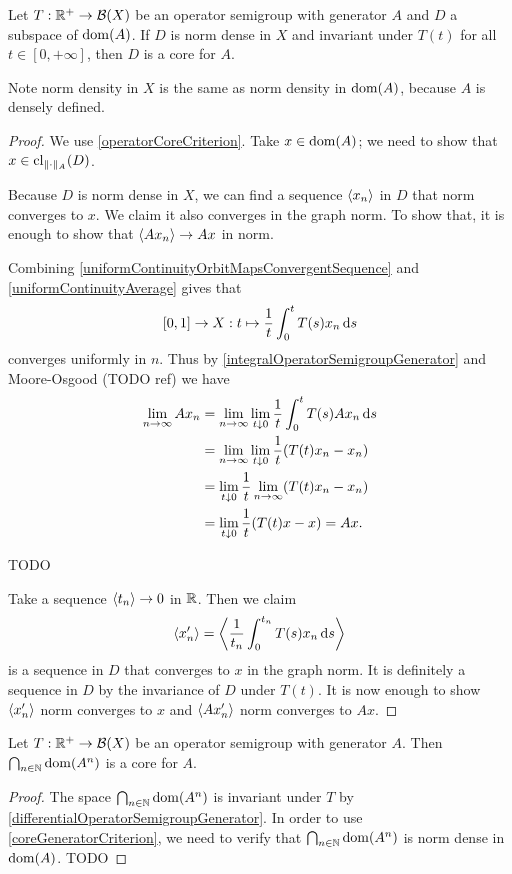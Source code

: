 \begin{proposition} \label{coreGeneratorCriterion}
Let $T: \mathbb{R}^+\to \operatorname{\mathcal{B}}(X)$ be an operator semigroup with generator $A$ and $D$ a subspace of $\operatorname{dom}(A)$. If $D$ is norm dense in $X$ and invariant under $T(t)$ for all $t\in [0,+\infty]$, then $D$ is a core for $A$.
\end{proposition}
Note norm density in $X$ is the same as norm density in $\operatorname{dom}(A)$, because $A$ is densely defined.
\begin{proof}
We use \ref{operatorCoreCriterion}. Take $x\in \operatorname{dom}(A)$; we need to show that $x\in\operatorname{cl}_{\lVert\cdot\rVert_A}(D)$.

Because $D$ is norm dense in $X$, we can find a sequence $\left\langle x_n \right\rangle$ in $D$ that norm converges to $x$. We claim it also converges in the graph norm. To show that, it is enough to show that $\left\langle Ax_n \right\rangle \to Ax$ in norm.

Combining \ref{uniformContinuityOrbitMapsConvergentSequence} and \ref{uniformContinuityAverage} gives that
\[ [0,1] \to X: t\mapsto \frac{1}{t}\int_0^t T(s)x_n\operatorname{d \!}{s} \]
converges uniformly in $n$. Thus by \ref{integralOperatorSemigroupGenerator} and Moore-Osgood (TODO ref) we have
\begin{align*}
\lim_{n\to \infty} Ax_n &= \lim_{n\to \infty} \lim_{t\downarrow 0}\frac{1}{t}\int_0^t T(s)Ax_n \operatorname{d \!}{s} \\
&= \lim_{n\to \infty} \lim_{t\downarrow 0}\frac{1}{t}(T(t)x_n - x_n) \\
&= \lim_{t\downarrow 0}\frac{1}{t}\lim_{n\to \infty}(T(t)x_n - x_n) \\
&= \lim_{t\downarrow 0}\frac{1}{t}(T(t)x - x) = Ax.
\end{align*}

TODO

Take a sequence $\left\langle t_n \right\rangle\to 0$ in $\mathbb{R}$. Then we claim
\[ \left\langle x'_n \right\rangle = \left\langle \frac{1}{t_n}\int_0^{t_n}T(s)x_n\operatorname{d \!}{s} \right\rangle \]
is a sequence in $D$ that converges to $x$ in the graph norm. It is definitely a sequence in $D$ by the invariance of $D$ under $T(t)$. It is now enough to show $\left\langle x'_n \right\rangle$ norm converges to $x$ and $\left\langle Ax'_n \right\rangle$ norm converges to $Ax$.
\end{proof}

\begin{proposition}
Let $T: \mathbb{R}^+\to \operatorname{\mathcal{B}}(X)$ be an operator semigroup with generator $A$. Then $\bigcap_{n\in\mathbb{N}}\operatorname{dom}(A^n)$ is a core for $A$.
\end{proposition}
\begin{proof}
The space $\bigcap_{n\in\mathbb{N}}\operatorname{dom}(A^n)$ is invariant under $T$ by \ref{differentialOperatorSemigroupGenerator}. In order to use \ref{coreGeneratorCriterion}, we need to verify that $\bigcap_{n\in\mathbb{N}}\operatorname{dom}(A^n)$ is norm dense in $\operatorname{dom} (A)$. TODO
\end{proof}

